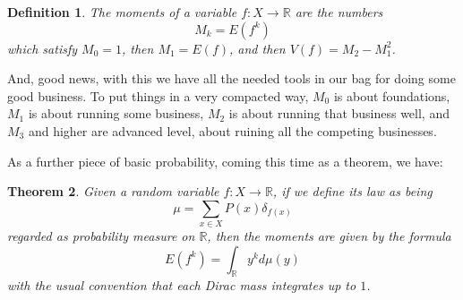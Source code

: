 \documentclass[12pt]{amsbook}
\newtheorem{theorem}{Theorem}[chapter]
\newtheorem{definition}[theorem]{Definition}
\begin{document}
\begin{definition}
The moments of a variable $f:X\to\mathbb R$ are the numbers
$$M_k=E(f^k)$$
which satisfy $M_0=1$, then $M_1=E(f)$, and then $V(f)=M_2-M_1^2$.
\end{definition}

And, good news, with this we have all the needed tools in our bag for doing some good business. To put things in a very compacted way, $M_0$ is about foundations, $M_1$ is about running some business, $M_2$ is about running that business well, and $M_3$ and higher are advanced level, about ruining all the competing businesses.

\bigskip

As a further piece of basic probability, coming this time as a theorem, we have:


\begin{theorem}
Given a random variable $f:X\to\mathbb R$, if we define its law as being
$$\mu=\sum_{x\in X}P(x)\delta_{f(x)}$$
regarded as probability measure on $\mathbb R$, then the moments are given by the formula
$$E(f^k)=\int_\mathbb Ry^kd\mu(y)$$
with the usual convention that each Dirac mass integrates up to $1$.
\end{theorem}
\end{document}
